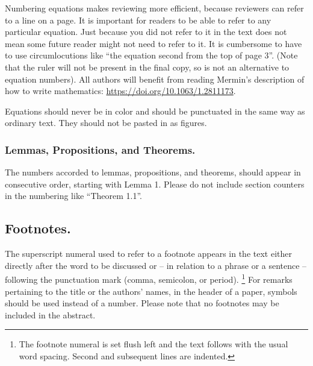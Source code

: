 \documentclass[runningheads]{eccv/llncs}
\begin{document}
Numbering equations makes reviewing more efficient, because reviewers can refer to a line on a page.  
It is important for readers to be able to refer to any particular equation.
Just because you did not refer to it in the text does not mean some future reader might not need to refer to it.
It is cumbersome to have to use circumlocutions like ``the equation second from the top of page 3''.
(Note that the ruler will not be present in the final copy, so is not an alternative to equation numbers).
All authors will benefit from reading Mermin's description of how to write mathematics:
\url{https://doi.org/10.1063/1.2811173}.

Equations should never be in color and should be punctuated in the same way as ordinary text.
They should not be pasted in as figures.


\subsubsection{Lemmas, Propositions, and Theorems.}
The numbers accorded to lemmas, propositions, and theorems, \etc should appear in consecutive order, starting with Lemma 1. 
Please do not include section counters in the numbering like ``Theorem 1.1''.


\subsection{Footnotes.}
The superscript numeral used to refer to a footnote appears in the text either directly after the word to be discussed or -- in relation to a phrase or a sentence -- following the punctuation mark (comma, semicolon, or period).%
\footnote{The footnote numeral is set flush left and the text follows with the usual word spacing. 
  Second and subsequent lines are indented. 
}
For remarks pertaining to the title or the authors' names, in the header of a paper, symbols should be used instead of a number.
Please note that no footnotes may be included in the abstract.
\end{document}
